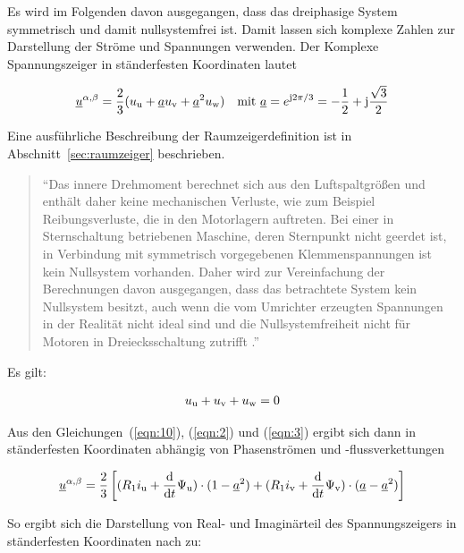Es wird im Folgenden davon ausgegangen, dass das dreiphasige System symmetrisch und damit nullsystemfrei ist.
Damit lassen sich komplexe Zahlen zur Darstellung der Ströme und Spannungen verwenden.
Der Komplexe Spannungszeiger in ständerfesten Koordinaten lautet

\begin{align}
\underline{u}^{\alpha, \beta} = \frac{2}{3}(u_{\mathrm{u}} + \underline{a} u_{\mathrm{v}} + \underline{a}^2 u_{\mathrm{w}} ) \quad \text{mit}\,\, \underline{a} = e^{\mathrm{j}2\pi/3} = -\frac{1}{2}+\mathrm{j}\frac{\sqrt{3}}{2} \label{eqn:2}
\end{align}

Eine ausführliche Beschreibung der Raumzeigerdefinition ist in Abschnitt~\ref{sec:raumzeiger} beschrieben.

\begin{quote}
\enquote{Das innere Drehmoment berechnet sich aus den Luftspaltgrößen und enthält daher keine mechanischen Verluste, wie zum Beispiel Reibungsverluste, die in den Motorlagern auftreten.
Bei einer in Sternschaltung betriebenen Maschine, deren Sternpunkt nicht geerdet ist, in Verbindung mit symmetrisch vorgegebenen Klemmenspannungen ist kein Nullsystem vorhanden.
Daher wird zur Vereinfachung der Berechnungen davon ausgegangen, dass das betrachtete System kein Nullsystem besitzt, auch wenn die vom Umrichter erzeugten Spannungen in der Realität nicht ideal sind und die Nullsystemfreiheit nicht für Motoren in Dreiecksschaltung zutrifft \autocite[S.~25]{kellner2012}.}
\end{quote}

Es gilt:

\begin{align}
u_{\mathrm{u}} + u_{\mathrm{v}} + u_{\mathrm{w}} = 0 \label{eqn:3}
\end{align}

Aus den Gleichungen~(\ref{eqn:10}), (\ref{eqn:2}) und (\ref{eqn:3}) ergibt sich dann in ständerfesten Koordinaten abhängig von Phasenströmen und -flussverkettungen

\begin{align}
\underline{u}^{\alpha, \beta} = \frac{2}{3} \left[ (R_{\mathrm{1}}i_{\mathrm{u}} + \frac{\mathrm{d}}{\mathrm{d}t}\Psi_{\mathrm{u}})\cdot (1-\underline{a}^2) + (R_{\mathrm{1}}i_{\mathrm{v}} + \frac{\mathrm{d}}{\mathrm{d}t}\Psi_{\mathrm{v}})\cdot (\underline{a}-\underline{a}^2) \right]
\end{align}

So ergibt sich die Darstellung von Real- und Imaginärteil des Spannungszeigers in ständerfesten Koordinaten nach \textcite{kellner2012} zu:

